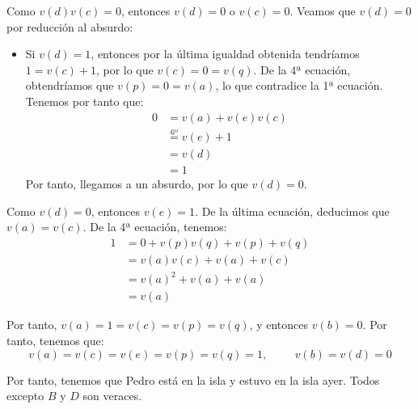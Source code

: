 \begin{ejercicio}
    Como $v(d)v(c)=0$, entonces $v(d)=0$ o $v(c)=0$. Veamos que $v(d)=0$ por reducción al absurdo:
    \begin{itemize}
        \item Si $v(d)=1$, entonces por la última igualdad obtenida tendríamos $1=v(c)+1$, por lo que
        $v(c)=0=v(q)$. De la 4ª ecuación, obtendríamos que $v(p)=0=v(a)$, lo que contradice la 1ª ecuación. Tenemos por tanto que:
        \begin{align*}
            0 &= v(a) + v(e)v(c) \\
            &\stackrel{6\text{º}}{=} v(e)+1 \\
            &= v(d) \\
            &= 1
        \end{align*}
        Por tanto, llegamos a un absurdo, por lo que $v(d)=0$.
    \end{itemize}
    Como $v(d)=0$, entonces $v(e)=1$. De la última ecuación, deducimos que $v(a)=v(c)$. De la 4ª ecuación, tenemos:
    \begin{align*}
        1 &= 0+v(p)v(q)+v(p)+v(q)\\
        &= v(a)v(c) + v(a) + v(c)\\
        &= v(a)^2 + v(a) + v(a)\\
        &= v(a)
    \end{align*}

    Por tanto, $v(a)=1=v(c)=v(p)=v(q)$, y entonces $v(b)=0$. Por tanto, tenemos que:
    \begin{equation*}
        v(a)=v(c)=v(e)=v(p)=v(q)=1,\hspace{1cm}v(b)=v(d)=0
    \end{equation*}

    Por tanto, tenemos que Pedro está en la isla y estuvo en la isla ayer. Todos excepto $B$ y $D$ son veraces.
\end{ejercicio}